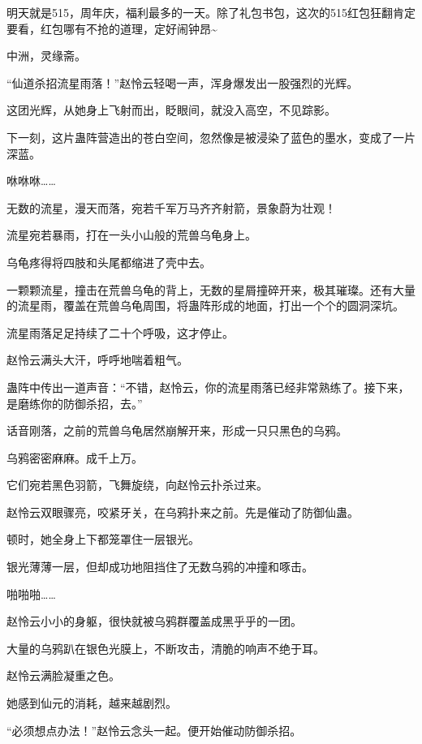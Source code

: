
\begin{this_body}

明天就是515，周年庆，福利最多的一天。除了礼包书包，这次的515红包狂翻肯定要看，红包哪有不抢的道理，定好闹钟昂\~{}

中洲，灵缘斋。

“仙道杀招流星雨落！”赵怜云轻喝一声，浑身爆发出一股强烈的光辉。

这团光辉，从她身上飞射而出，眨眼间，就没入高空，不见踪影。

下一刻，这片蛊阵营造出的苍白空间，忽然像是被浸染了蓝色的墨水，变成了一片深蓝。

咻咻咻……

无数的流星，漫天而落，宛若千军万马齐齐射箭，景象蔚为壮观！

流星宛若暴雨，打在一头小山般的荒兽乌龟身上。

乌龟疼得将四肢和头尾都缩进了壳中去。

一颗颗流星，撞击在荒兽乌龟的背上，无数的星屑撞碎开来，极其璀璨。还有大量的流星雨，覆盖在荒兽乌龟周围，将蛊阵形成的地面，打出一个个的圆洞深坑。

流星雨落足足持续了二十个呼吸，这才停止。

赵怜云满头大汗，呼呼地喘着粗气。

蛊阵中传出一道声音：“不错，赵怜云，你的流星雨落已经非常熟练了。接下来，是磨练你的防御杀招，去。”

话音刚落，之前的荒兽乌龟居然崩解开来，形成一只只黑色的乌鸦。

乌鸦密密麻麻。成千上万。

它们宛若黑色羽箭，飞舞旋绕，向赵怜云扑杀过来。

赵怜云双眼骤亮，咬紧牙关，在乌鸦扑来之前。先是催动了防御仙蛊。

顿时，她全身上下都笼罩住一层银光。

银光薄薄一层，但却成功地阻挡住了无数乌鸦的冲撞和啄击。

啪啪啪……

赵怜云小小的身躯，很快就被乌鸦群覆盖成黑乎乎的一团。

大量的乌鸦趴在银色光膜上，不断攻击，清脆的响声不绝于耳。

赵怜云满脸凝重之色。

她感到仙元的消耗，越来越剧烈。

“必须想点办法！”赵怜云念头一起。便开始催动防御杀招。


\end{this_body}

